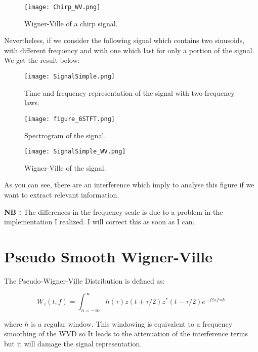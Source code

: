 \begin{figure}[H]
\centering
    \texttt{[image: Chirp\_WV.png]}
    \caption{Wigner-Ville of a chirp signal.}
    \label{fig:Chirp_WV}
\end{figure}

Nevertheless, if we consider the following signal which contains two sinusoids, with different frequency and with one which last for only a portion of the signal. We get the result below:

\begin{figure}[H]
\centering
    \texttt{[image: SignalSimple.png]}
    \caption{Time and frequency representation of the signal with two frequency laws.}
    \label{fig:SignalSimple}
\end{figure}

\begin{figure}[H]
\centering
    \texttt{[image: figure\_6STFT.png]}
    \caption{Spectrogram of the signal.}
    \label{fig:SignalSimple_Spectrogram}
\end{figure}

\begin{figure}[H]
\centering
    \texttt{[image: SignalSimple\_WV.png]}
    \caption{Wigner-Ville of the signal.}
    \label{fig:SignalSimple_WV}
\end{figure}

As you can see, there are an interference which imply to analyse this figure if we want to extract relevant information.

\textbf{NB :} The differences in the frequency scale is due to a problem in the implementation I realized. I will correct this as soon as I can.

\chapter{Pseudo Smooth Wigner-Ville}

The  Pseudo-Wigner-Ville Distribution is defined as:

\begin{equation}
W_z(t,f) = \int_{n=-\infty}^{\infty} h ( \tau ) z ( t + \tau / 2 ) z^* (t - \tau / 2) e^{-j 2 \pi f \tau d \tau}
\end{equation}

where $h$ is a regular window. This windowing is equivalent to a frequency smoothing of the WVD so It leads to the attenuation of the interference terms but it will damage the signal representation.

